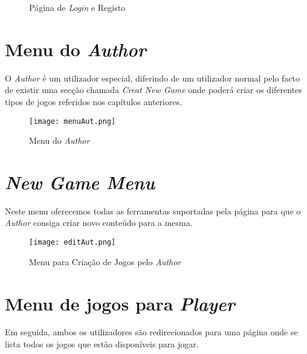 \documentclass[11pt,a4paper]{report}
\begin{document}
\begin{figure}[h]%
    \centering
    \qquad
    \qquad
    \caption{Página de \emph{Login} e Registo}%
    \label{fig:log&sigUp}%
\end{figure}

\section{Menu do \emph{Author}}
O \emph{Author} é um utilizador especial, diferindo de um utilizador normal pelo facto de existir uma secção chamada \emph{Creat New Game} onde poderá criar os diferentes tipos de jogos referidos nos capítulos anteriores.\newline\newline

\begin{figure}[h]
    \centering
    \texttt{[image: menuAut.png]}
    \caption{Menu do \emph{Author}}
    \label{fig:menuAut}
\end{figure}

\newpage

\section{\emph{New Game Menu}}
Neste menu oferecemos todas as ferramentas suportadas pela página para que o \emph{Author} consiga criar novo conteúdo para a mesma.\newline\newline

\begin{figure}[h]
    \centering
    \texttt{[image: editAut.png]}
    \caption{Menu para Criação de Jogos pelo \emph{Author}}
    \label{fig:editAut}
\end{figure}

\section{Menu de jogos para \emph{Player}}
Em seguida, ambos os utilizadores são redirecionados para uma página onde se lista todos os jogos que estão disponíveis para jogar.\newline\newline
\end{document}
